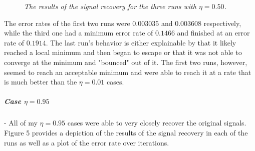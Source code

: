 \documentclass{article} %
\begin{document}
\begin{figure}
{            \label{fig:right}%
        }\hfill%
    \caption{\textit{The results of the signal recovery for the three runs with \(\eta=0.50\).}}
    \label{fig:default}
\end{figure} 

The error rates of the first two runs were \(0.003035\) and \(0.003608\) respectively, while the third one had a minimum error rate of \(0.1466\) and finished at an error rate of \(0.1914\). The last run's behavior is either explainable by that it likely reached a local minimum and then began to escape or that it was not able to converge at the minimum and "bounced" out of it. The first two runs, however, seemed to reach an acceptable minimum and were able to reach it at a rate that is much better than the \(\eta=0.01\) cases.

\subparagraph{\textit{Case \(\eta=0.95\)}}- All of my \(\eta=0.95\) cases were able to very closely recover the original signals. Figure 5 provides a depiction of the results of the signal recovery in each of the runs as well as a plot of the error rate over iterations. 
\end{document}
